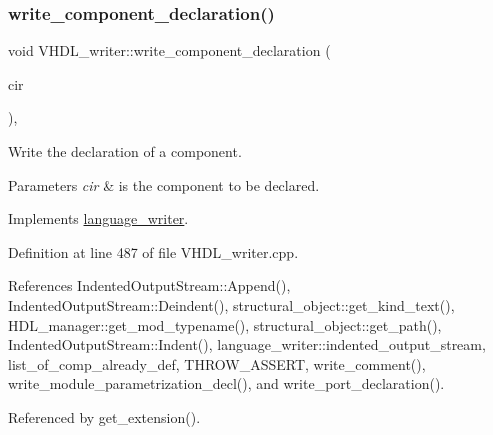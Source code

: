 \subsubsection{\texorpdfstring{write\+\_\+component\+\_\+declaration()}{write\_component\_declaration()}}
{\footnotesize\ttfamily void V\+H\+D\+L\+\_\+writer\+::write\+\_\+component\+\_\+declaration (\begin{DoxyParamCaption}\item[{const \hyperlink{structural__objects_8hpp_a8ea5f8cc50ab8f4c31e2751074ff60b2}{structural\+\_\+object\+Ref} \&}]{cir }\end{DoxyParamCaption})\hspace{0.3cm}{\ttfamily [override]}, {\ttfamily [virtual]}}



Write the declaration of a component. 


\begin{DoxyParams}{Parameters}
{\em cir} & is the component to be declared. \\
\hline
\end{DoxyParams}


Implements \hyperlink{classlanguage__writer_a99c30813a77c594298e9d4612d2a7e29}{language\+\_\+writer}.



Definition at line 487 of file V\+H\+D\+L\+\_\+writer.\+cpp.



References Indented\+Output\+Stream\+::\+Append(), Indented\+Output\+Stream\+::\+Deindent(), structural\+\_\+object\+::get\+\_\+kind\+\_\+text(), H\+D\+L\+\_\+manager\+::get\+\_\+mod\+\_\+typename(), structural\+\_\+object\+::get\+\_\+path(), Indented\+Output\+Stream\+::\+Indent(), language\+\_\+writer\+::indented\+\_\+output\+\_\+stream, list\+\_\+of\+\_\+comp\+\_\+already\+\_\+def, T\+H\+R\+O\+W\+\_\+\+A\+S\+S\+E\+RT, write\+\_\+comment(), write\+\_\+module\+\_\+parametrization\+\_\+decl(), and write\+\_\+port\+\_\+declaration().



Referenced by get\+\_\+extension().

